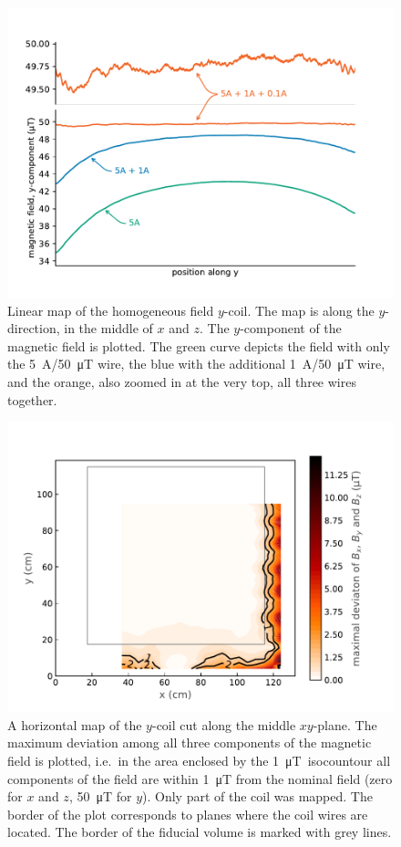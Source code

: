 \begin{figure}
  \centering
  \includegraphics[width=0.9\linewidth]{gfx/prototype/y_scan_all_double.pdf}
  \caption{Linear map of the homogeneous field $y$-coil. The map is along the $y$-direction, in the middle of $x$ and $z$. The $y$-component of the magnetic field is plotted. The green curve depicts the field with only the \SI{5}{\ampere}/\SI{50}{\micro\tesla} wire, the blue with the additional \SI{1}{\ampere}/\SI{50}{\micro\tesla} wire, and the orange, also zoomed in at the very top, all three wires together.}\label{fig:prototype_linear_map}
\end{figure}

\begin{figure}
  \centering
  \includegraphics[width=\linewidth]{gfx/prototype/planar_map_Y_max_deviation.pdf}
  \caption{A horizontal map of the $y$-coil cut along the middle $xy$-plane. The maximum deviation among all three components of the magnetic field is plotted, i.e.\ in the area enclosed by the \SI{1}{\micro\tesla}~isocountour all components of the field are within \SI{1}{\micro\tesla} from the nominal field (zero for $x$ and $z$, \SI{50}{\micro\tesla} for $y$). Only part of the coil was mapped. The border of the plot corresponds to planes where the coil wires are located. The border of the fiducial volume is marked with grey lines.}\label{fig:prototype_plane_map}
\end{figure}

